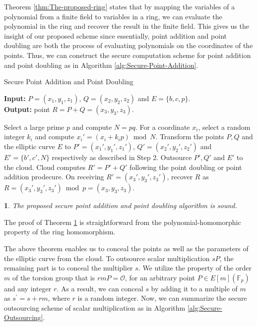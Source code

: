 \documentclass[english,draftcls,onecolumn,11pt]{IEEEtran}
\theoremstyle{definition}
\theoremstyle{plain}
\newtheorem{thm}{\protect\theoremname}
\theoremstyle{plain}
\theoremstyle{definition}
\providecommand{\theoremname}{Theorem}
\begin{document}
Theorem \ref{thm:The-proposed-ring} states that by mapping the variables
of a polynomial from a finite field to variables in a ring, we can
evaluate the polynomial in the ring and recover the result in the
finite field. This gives us the insight of our proposed scheme since
essentially, point addition and point doubling are both the process
of evaluating polynomials on the coordinates of the points. Thus,
we can construct the secure computation scheme for point addition
and point doubling as in Algorithm \ref{alg:Secure-Point-Addition}. 

\begin{algorithm}[tbh] 
\caption{Secure Point Addition and Point Doubling\label{alg:Secure-Point-Addition}}

\textbf{Input:} $P=(x_1,y_1,z_1)$, $Q=(x_2,y_2,z_2)$ and $E=\{b,c,p \}$.\\
\textbf{Output:} point $R=P+Q=(x_3,y_3,z_3)$.

\begin{algorithmic}[1] 
\STATE Select a large prime $p$ and compute $N=pq$. 
\STATE For a coordinate $x_i$, select a random integer $k_i$ and compute $x_i'=(x_i+k_ip)\bmod N$.
\STATE Transform the points $P,Q$ and the elliptic curve $E$ to $P'=(x_1',y_1',z_1')$, $Q'=(x_2',y_2',z_2')$ and $E'=\{b',c',N\}$ respectively as described in Step 2. 
\STATE Outsource $P', Q'$ and $E'$ to the cloud.
\STATE Cloud computes $R'=P'+Q'$ following the point doubling or point addition prodecure.
\STATE On receiving $R'=(x_3',y_3',z_3')$, recover $R$ as $R=(x_3',y_3',z_3')\bmod p=(x_3,y_3,z_3)$.
\end{algorithmic} 
\end{algorithm}
\begin{thm}
\label{thm:The-proposed-secure}The proposed secure point addition
and point doubling algorithm is sound.
\end{thm}
The proof of Theorem \ref{thm:The-proposed-secure} is straightforward
from the polynomial-homomorphic property of the ring homomorphism.

The above theorem enables us to conceal the points as well as the
parameters of the elliptic curve from the cloud. To outsource scalar
multiplication $sP$, the remaining part is to conceal the multiplier
$s$. We utilize the property of the order $m$ of the torsion group
that is $rmP=\mathcal{O}$, for an arbitrary point $P\in E[m](\mathbb{F}_{p})$
and any integer $r$. As a result, we can conceal $s$ by adding it
to a multiple of $m$ as $s^{\prime}=s+rm$, where $r$ is a random
integer. Now, we can summarize the secure outsourcing scheme of scalar
multiplication as in Algorithm \ref{alg:Secure-Outsourcing}.
\end{document}
